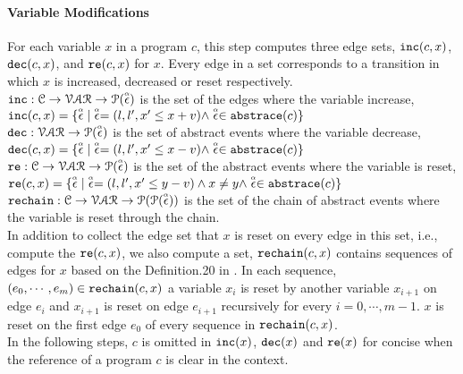 \paragraph*{Variable Modifications}
For each variable $x$ in a program $c$, this step computes three edge sets, $\mathtt{inc}(c, x)$, $\mathtt{dec}(c, x)$,
and $\mathtt{re}(c, x)$ for $x$.
Every edge in a set corresponds to a transition in which $x$ is increased,
decreased
or reset
respectively.
\\
$\mathtt{inc}: \mathcal{C} \to \mathcal{VAR} \to \mathcal{P}(\stackrel{\scriptscriptstyle{\alpha}}{\mathtt{\epsilon}{}}) $
is the set of the edges where the variable increase, 
\\
$\mathtt{inc}(c, x) = \{ \stackrel{\scriptscriptstyle{\alpha}}{\mathtt{\epsilon}{}} | \stackrel{\scriptscriptstyle{\alpha}}{\mathtt{\epsilon}{}} = (l, l', x' \leq x + v) \land \stackrel{\scriptscriptstyle{\alpha}}{\mathtt{\epsilon}{}} \in \mathtt{abs}{\mathtt{trace}}(c)\}$
\\
$\mathtt{dec}: \mathcal{VAR} \to \mathcal{P}(\stackrel{\scriptscriptstyle{\alpha}}{\mathtt{\epsilon}{}}) $
is the set of abstract events where the variable decrease,
\\
$\mathtt{dec}(c, x) = \{\stackrel{\scriptscriptstyle{\alpha}}{\mathtt{\epsilon}{}}| \stackrel{\scriptscriptstyle{\alpha}}{\mathtt{\epsilon}{}} = (l, l', x' \leq x - v) \land \stackrel{\scriptscriptstyle{\alpha}}{\mathtt{\epsilon}{}} \in \mathtt{abs}{\mathtt{trace}}(c)\}$
\\
$\mathtt{re}: \mathcal{C} \to \mathcal{VAR} \to \mathcal{P}(\stackrel{\scriptscriptstyle{\alpha}}{\mathtt{\epsilon}{}}) $
is the set of the abstract events where the variable is reset,
\\
$\mathtt{re}(c, x) = \{\stackrel{\scriptscriptstyle{\alpha}}{\mathtt{\epsilon}{}}| \stackrel{\scriptscriptstyle{\alpha}}{\mathtt{\epsilon}{}} = (l, l', x' \leq y - v) \land x \neq y \land \stackrel{\scriptscriptstyle{\alpha}}{\mathtt{\epsilon}{}} \in \mathtt{abs}{\mathtt{trace}}(c)\}$
\\
$\mathtt{rechain}: \mathcal{C} \to \mathcal{VAR} \to \mathcal{P}(\mathcal{P}(\stackrel{\scriptscriptstyle{\alpha}}{\mathtt{\epsilon}{}})) $
is the set of the chain of abstract events where the variable is reset through the chain.
\\
In addition to
collect the edge set that $x$ is reset on every edge in this set, i.e., compute the $\mathtt{re}(c, x)$,
we also compute a set, $\mathtt{rechain}(c, x)$ contains sequences of edges for $x$
based on the Definition.20 in \cite{sinn2017complexity}.
In each sequence, $(e_0, \cdots, e_m) \in \mathtt{rechain}(c, x)$
a variable $x_i$ is reset by another variable $x_{i + 1}$ on edge $e_{i}$
and $x_{i + 1}$ is reset on edge $e_{i + 1}$ recursively
for every $i = 0, \cdots, m - 1$.
$x$ is reset on the first edge $e_0$ of every sequence in $\mathtt{rechain}(c, x)$.
% 
%
\\
In the following steps, $c$ is omitted in $\mathtt{inc}(x)$,
$\mathtt{dec}(x)$ and $\mathtt{re}(x)$ for concise when the reference of a program $c$ is clear in the context.
